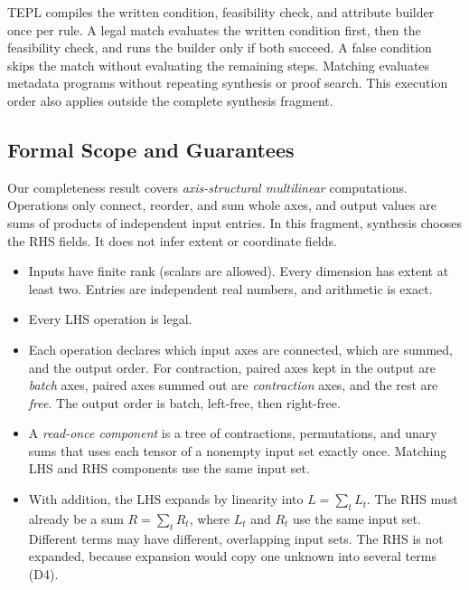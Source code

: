 TEPL compiles the written condition, feasibility check, and attribute
builder once per rule. A legal match evaluates the written condition first,
then the feasibility check, and runs the builder only if both succeed.
A false condition skips the match without evaluating the remaining steps.
Matching evaluates metadata programs without repeating synthesis or proof
search. This execution order also applies outside the complete synthesis
fragment.

\subsection{Formal Scope and Guarantees}
\label{sec:formal-scope}
Our completeness result covers \emph{axis-structural multilinear}
computations. Operations only connect, reorder, and sum whole axes, and
output values are sums of products of independent input entries. In this
fragment, synthesis chooses the RHS  fields. It does not infer
extent or coordinate fields.

\begin{itemize}
\item Inputs have finite rank (scalars are allowed). Every dimension has
extent at least two. Entries are independent real numbers, and arithmetic
is exact.
\item Every LHS operation is legal.
\item Each operation declares which input axes are connected, which are
summed, and the output order. For contraction, paired axes kept in the
output are \emph{batch} axes, paired axes summed out are \emph{contraction}
axes, and the rest are \emph{free}. The output order is batch, left-free,
then right-free.
\item A \emph{read-once component} is a tree of contractions, permutations,
and unary sums that uses each tensor of a nonempty input set exactly once.
Matching LHS and RHS components use the same input set.
\item With addition, the LHS expands by linearity into $L=\sum_t L_t$. The
RHS must already be a sum $R=\sum_t R_t$, where $L_t$ and $R_t$ use the same
input set. Different terms may have different, overlapping input sets. The
RHS is not expanded, because expansion would copy one unknown into several
terms (D4).
\end{itemize}

